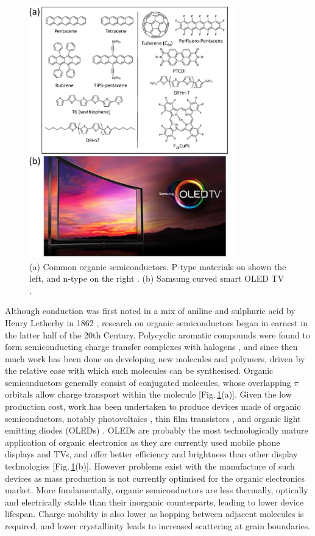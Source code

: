 \begin{figure}[h!]
\centering
\includegraphics[width=0.8\textwidth]{Fig2}
\caption{(a) Common organic semiconductors. P-type materials on shown the left, and n-type on the right \cite{Miozzo2010}. (b) Samsung curved smart OLED TV \cite{Samsung}.}
\label{1Fig2}
\end{figure}
Although conduction was first noted in a mix of aniline and sulphuric acid by Henry Letherby in 1862 \cite{Letheby}, research on organic semiconductors began in earnest in the latter half of the 20th Century. Polycyclic aromatic compounds were found to form semiconducting charge transfer complexes with halogens \cite{Naarmann2002}, and since then much work has been done on developing new molecules and polymers, driven by the relative ease with which such molecules can be synthesised. Organic semiconductors generally consist of conjugated molecules, whose overlapping $\pi$ orbitals allow charge transport within the molecule [Fig.\,\ref{1Fig2}(a)]. Given the low production cost, work has been undertaken to produce devices made of organic semiconductors, notably photovoltaics \cite{Halls1996, Chiu2012, Li2006}, thin film transistors \cite{Klauk2010, Fukuda2014, Yuan2014}, and organic light emitting diodes (OLEDs) \cite{Tang1987, Burroughes1990, Hebner1998}. OLEDs are probably the most technologically mature application of organic electronics as they are currently used mobile phone displays and TVs, and offer better efficiency and brightness than other display technologies [Fig.\,\ref{1Fig2}(b)]. However problems exist with the manufacture of such devices as mass production is not currently optimised for the organic electronics market. More fundamentally, organic semiconductors are less thermally, optically and electrically stable than their inorganic counterparts, leading to lower device lifespan. Charge mobility is also lower as hopping between adjacent molecules is required, and lower crystallinity leads to increased scattering at grain boundaries. 

